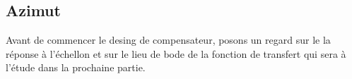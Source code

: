 \documentclass{udes_rapport} %
\begin{document}
\subsection{Azimut}
Avant de commencer le desing de compensateur, posons un regard sur le la réponse à l'échellon et sur le lieu de bode de la fonction de transfert qui sera à l'étude dans la prochaine partie.\\
\noindent\begin{minipage}{\textwidth}
 
\begin{minipage}{0.5\textwidth}
\end{minipage}%
\begin{minipage}{0.5\textwidth}
\end{minipage} 

\label{fig:init_A_AZ} 
\end{minipage}
\end{document}
